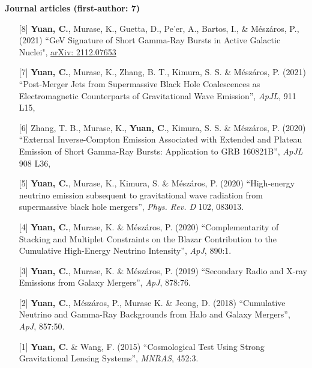 \documentclass[11pt,english]{article}
\begin{document}
\begin{addmargin}[0.56em]{2em}
{\bf \small{Journal articles (first-author: 7)}}
\end{addmargin}
\begin{enumerate}

\item[{[8]}] {\bf Yuan, C.}, Murase, K., Guetta, D., Pe'er, A., Bartos, I., \&  M\'esz\'aros, P., (2021) ``GeV Signature of Short Gamma-Ray Bursts in Active Galactic Nuclei", \href{https://arxiv.org/abs/2112.07653}{arXiv: 2112.07653}

\item[{[7]}] {{\bf Yuan, C.}, Murase, K., Zhang, B. T., Kimura, S. S. \& M\'esz\'aros, P. (2021) ``Post-Merger Jets from Supermassive Black Hole Coalescences as Electromagnetic Counterparts of Gravitational Wave Emission'', \emph{ApJL}, 911 L15,  }

\item[{[6]}] {Zhang, T. B., Murase, K., {\bf Yuan, C}., Kimura, S. S. \& M\'esz\'aros, P. (2020) ``External Inverse-Compton Emission Associated with Extended and Plateau Emission of Short Gamma-Ray Bursts: Application to GRB 160821B'', \emph{ApJL} 908 L36, }

\item[{[5]}] {{\bf Yuan, C.}, Murase, K., Kimura, S. \& M\'esz\'aros, P. (2020) ``High-energy neutrino emission subsequent to gravitational wave radiation from supermassive black hole mergers'', \emph{Phys. Rev. D} 102, 083013. }

\item[{[4]}] {{\bf Yuan, C.}, Murase, K. \& M\'esz\'aros, P. (2020) ``Complementarity of Stacking and Multiplet Constraints on the Blazar Contribution to the Cumulative High-Energy Neutrino Intensity'', \emph{ApJ}, 890:1. }

\item[{[3]}] {{\bf Yuan, C.}, Murase, K. \& M\'esz\'aros, P. (2019) ``Secondary Radio and X-ray Emissions from Galaxy Mergers'', \emph{ApJ}, 878:76. }

\item[{[2]}] {{\bf Yuan, C.}, M\'esz\'aros, P., Murase K. \& Jeong, D. (2018) ``Cumulative Neutrino and Gamma-Ray Backgrounds from Halo and Galaxy Mergers'', \emph{ApJ}, 857:50. }

\item[{[1]}] {{\bf Yuan, C.} \& Wang, F. (2015) ``Cosmological Test Using Strong Gravitational Lensing Systems'', \emph{MNRAS}, 452:3. }
\end{enumerate}
\end{document}
